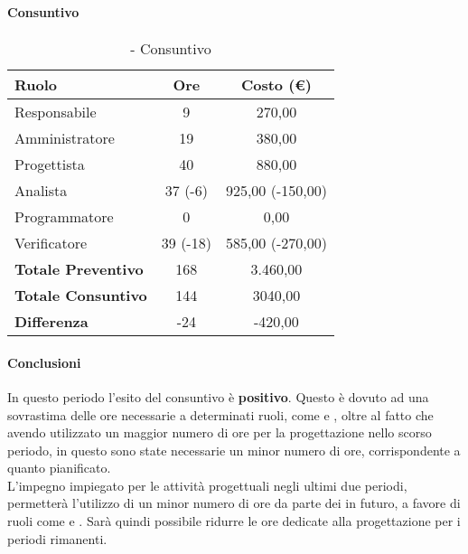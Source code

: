 \documentclass[./PianoDiProgetto.tex]{subfiles}
\begin{document}
\subsubsection{\PerPD}
\paragraph{Consuntivo}
		\begin{table}[h]
		\centering
		\begin{tabular}{l * {2}{c}}
			\toprule
			\textbf{Ruolo} & \textbf{Ore} & \textbf{Costo (\euro{})} \\
			\midrule
			Responsabile &	9 & 270,00 \\
			Amministratore & 19 & 380,00\\
			Progettista & 40  & 880,00 \\
			Analista & 37 (-6) & 925,00 (-150,00) \\
			Programmatore & 0 & 0,00 \\
			Verificatore & 39 (-18) & 585,00 (-270,00) \\
			\midrule
			\textbf{Totale Preventivo} & 168
 & 3.460,00
 \\
			\textbf{Totale Consuntivo} & 144 & 3040,00
 \\
			\midrule
			\textbf{Differenza} & -24 & -420,00 \\
			\bottomrule
		\end{tabular}
		\caption{\PerPD{} - Consuntivo}

	\end{table}
	\paragraph{Conclusioni}
	In questo periodo l'esito del consuntivo è \textbf{positivo}. Questo è dovuto ad una sovrastima delle ore necessarie a determinati ruoli, come \AN{} e \VER{}, oltre al fatto che avendo utilizzato un maggior numero di ore per la progettazione nello scorso periodo, in questo sono 
state necessarie un minor numero di ore, corrispondente a quanto pianificato.\\
L'impegno impiegato per le attività progettuali negli ultimi due periodi, permetterà l'utilizzo di un minor numero di ore da parte dei \PJP{} in futuro, a favore di ruoli come \PRP{} e \VERP{}. Sarà quindi possibile ridurre le ore dedicate alla progettazione per i periodi rimanenti.
\subsubsection{\PerC}
\end{document}
